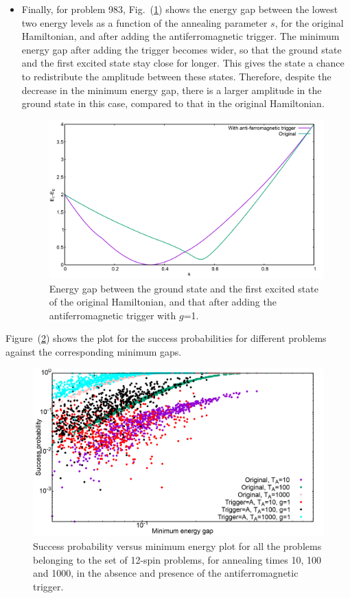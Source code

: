 \documentclass[../main.tex]{subfiles}
\begin{document}
\begin{itemize}
\item  Finally, for problem 983, Fig.~(\ref{fig:a51}) shows the energy gap between the lowest two energy levels as a function of the annealing parameter $s$, for the original Hamiltonian, and after adding the antiferromagnetic trigger. The minimum energy gap after adding the trigger becomes wider, so that the ground state and the first excited state stay close for longer. This gives the state a chance to redistribute the amplitude between these states. Therefore, despite the decrease in the minimum energy gap, there is a larger amplitude in the ground state in this case, compared to that in the original Hamiltonian.

\begin{figure}[H]
  \centering
  \includegraphics[scale=0.24]{983_Mingap.png}

\caption{Energy gap between the ground state and the first excited state of the original Hamiltonian, and that after adding the antiferromagnetic trigger with $g$=1.}
  \label{fig:a51}
\end{figure}
\end{itemize}

Figure~(\ref{fig:a36}) shows the plot for the success probabilities for different problems against the corresponding minimum gaps.

\begin{figure}[H]
\centering 
\includegraphics[scale=0.24]{SuccVsGap_OA_g1.png}
\caption{Success probability versus minimum energy plot for all the problems belonging to the set of 12-spin problems, for annealing times 10, 100 and 1000, in the absence and presence of the antiferromagnetic trigger.}
\label{fig:a36}
\end{figure}
\end{document}
